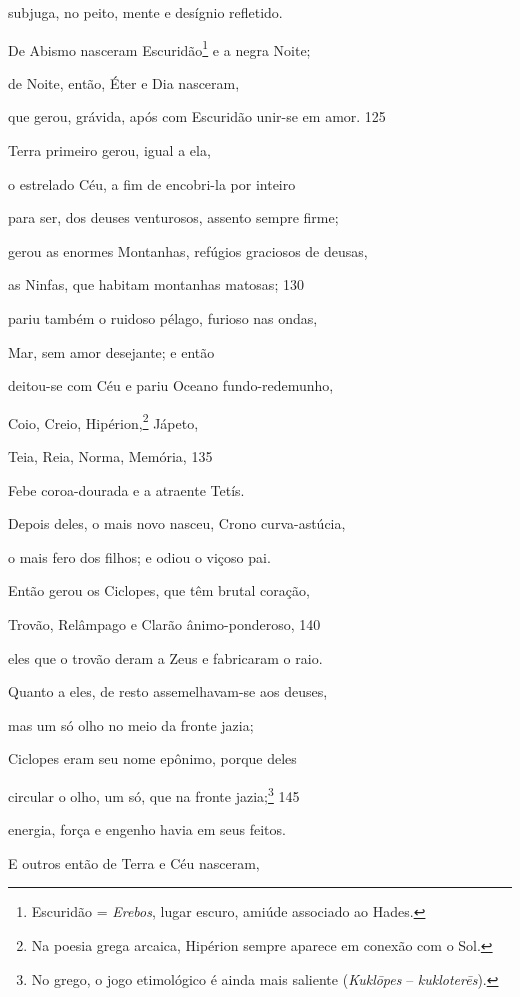 subjuga, no peito, mente e desígnio refletido.

\medskip

De Abismo nasceram Escuridão\footnote{Escuridão = \emph{Erebos}, lugar escuro, amiúde associado ao Hades.} e a negra Noite;

de Noite, então, Éter e Dia nasceram,

que gerou, grávida, após com Escuridão unir-se em amor. \num{125}

\medskip

Terra primeiro gerou, igual a ela,

o estrelado Céu, a fim de encobri-la por inteiro

para ser, dos deuses venturosos, assento sempre firme;

gerou as enormes Montanhas, refúgios graciosos de deusas,

as Ninfas, que habitam montanhas matosas; \num{130}

pariu também o ruidoso pélago, furioso nas ondas,

Mar, sem amor desejante; e então

deitou-se com Céu e pariu Oceano fundo-redemunho,

Coio, Creio, Hipérion,\footnote{Na poesia grega arcaica, Hipérion sempre aparece em conexão com o
Sol.} Jápeto,

Teia, Reia, Norma, Memória, \num{135}

Febe coroa-dourada e a atraente Tetís.

Depois deles, o mais novo nasceu, Crono curva-astúcia,

o mais fero dos filhos; e odiou o viçoso pai.

\quad{}Então gerou os Ciclopes, que têm brutal coração,

Trovão, Relâmpago e Clarão ânimo-ponderoso, \num{140}

eles que o trovão deram a Zeus e fabricaram o raio.

Quanto a eles, de resto assemelhavam-se aos deuses,

mas um só olho no meio da fronte jazia;

Ciclopes eram seu nome epônimo, porque deles

circular o olho, um só, que na fronte jazia;\footnote{No grego, o jogo etimológico é ainda mais saliente
(\emph{Kuklōpes} -- \emph{kukloterēs}).} \num{145}

energia, força e engenho havia em seus feitos.

\quad{}E outros então de Terra e Céu nasceram,

